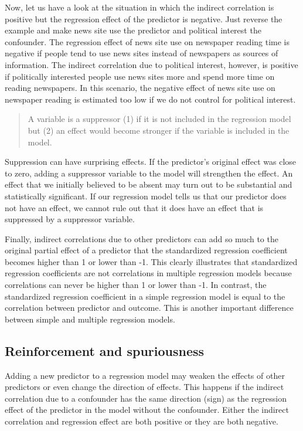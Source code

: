 \documentclass[a4paper]{book}
\theoremstyle{definition}
\theoremstyle{definition}
\theoremstyle{definition}
\theoremstyle{remark}
\begin{document}
Now, let us have a look at the situation in which the indirect
correlation is positive but the regression effect of the predictor is
negative. Just reverse the example and make news site use the predictor
and political interest the confounder. The regression effect of news
site use on newspaper reading time is negative if people tend to use
news sites instead of newspapers as sources of information. The indirect
correlation due to political interest, however, is positive if
politically interested people use news sites more and spend more time on
reading newspapers. In this scenario, the negative effect of news site
use on newspaper reading is estimated too low if we do not control for
political interest.

\begin{quote}
A variable is a suppressor (1) if it is not included in the regression
model but (2) an effect would become stronger if the variable is
included in the model.
\end{quote}

Suppression can have surprising effects. If the predictor's original
effect was close to zero, adding a suppressor variable to the model will
strengthen the effect. An effect that we initially believed to be absent
may turn out to be substantial and statistically significant. If our
regression model tells us that our predictor does not have an effect, we
cannot rule out that it does have an effect that is suppressed by a
suppressor variable.

Finally, indirect correlations due to other predictors can add so much
to the original partial effect of a predictor that the standardized
regression coefficient becomes higher than 1 or lower than -1. This
clearly illustrates that standardized regression coefficients are not
correlations in multiple regression models because correlations can
never be higher than 1 or lower than -1. In contrast, the standardized
regression coefficient in a simple regression model is equal to the
correlation between predictor and outcome. This is another important
difference between simple and multiple regression models.

\subsection{Reinforcement and spuriousness}\label{spuriousness}

Adding a new predictor to a regression model may weaken the effects of
other predictors or even change the direction of effects. This happens
if the indirect correlation due to a confounder has the same direction
(sign) as the regression effect of the predictor in the model without
the confounder. Either the indirect correlation and regression effect
are both positive or they are both negative.
\end{document}
